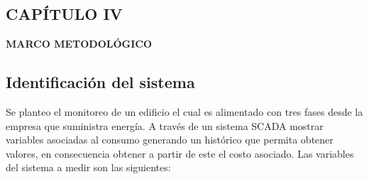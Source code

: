 \begin{center}
    \setcounter{section}{4}
    \section*{CAPÍTULO IV}
    \vspace*{0.5in}
    \textbf{MARCO METODOLÓGICO}
\end{center}
\setcounter{subsection}{0}

\subsection{Identificación del sistema}
    Se planteo el monitoreo de un edificio el cual es alimentado con tres fases desde la empresa que suministra energía. 
    A través de un sistema SCADA mostrar variables
    asociadas al consumo generando un histórico que permita obtener valores, en consecuencia obtener
    a partir de este el costo asociado. Las variables del sistema a medir son las siguientes:
